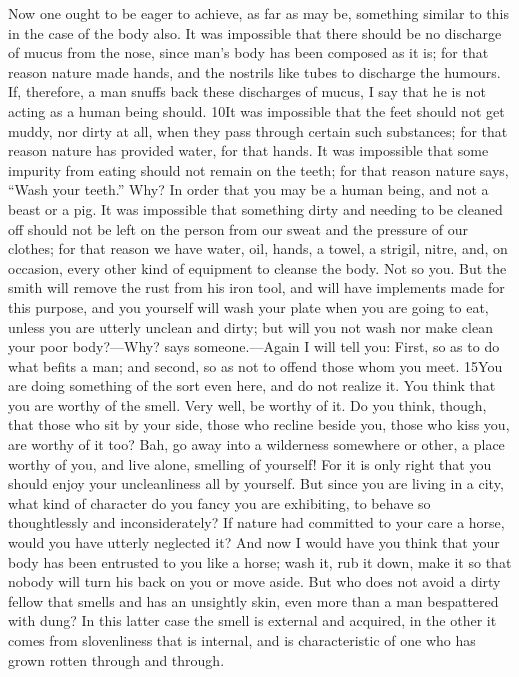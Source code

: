Now one ought to be eager to achieve, as far as may be, something similar to this in the case of the body also. It was impossible that there should be no discharge of mucus from the nose, since man's body has been composed as it is; for that reason nature made hands, and the nostrils like tubes to discharge the humours. If, therefore, a man snuffs back these discharges of mucus, I say that he is not acting as a human being should. 10It was impossible that the feet should not get muddy, nor dirty at all, when they pass through certain such substances; for that reason nature has provided water, for that hands. It was impossible that some impurity from eating should not remain on the teeth; for that reason nature says, ``Wash your teeth.'' Why? In order that you may be a human being, and not a beast or a pig. It was impossible that something dirty and needing to be cleaned off should not be left on the person from our sweat and the pressure of our clothes; for that reason we have water, oil, hands, a towel, a strigil, nitre, and, on occasion, every other kind of equipment to cleanse the body. Not so you. But the smith will remove the rust from his iron tool, and will have implements made for this purpose, and you yourself will wash your plate when you are going to eat, unless you are utterly unclean and dirty; but will you not wash nor make clean your poor body?—Why? says someone.—Again I will tell you: First, so as to do what befits a man; and second, so as not to offend those whom you meet. 15You are doing something of the sort even here, and do not realize it. You think that you are worthy of the smell. Very well, be worthy of it. Do you think, though, that those who sit by your side, those who recline beside you, those who kiss you, are worthy of it too? Bah, go away into a wilderness somewhere or other, a place worthy of you, and live alone, smelling of yourself! For it is only right that you should enjoy your uncleanliness all by yourself. But since you are living in a city, what kind of character do you fancy you are exhibiting, to behave so thoughtlessly and inconsiderately? If nature had committed to your care a horse, would you have utterly neglected it? And now I would have you think that your body has been entrusted to you like a horse; wash it, rub it down, make it so that nobody will turn his back on you or move aside. But who does not avoid a dirty fellow that smells and has an unsightly skin, even more than a man bespattered with dung? In this latter case the smell is external and acquired, in the other it comes from slovenliness that is internal, and is characteristic of one who has grown rotten through and through.

